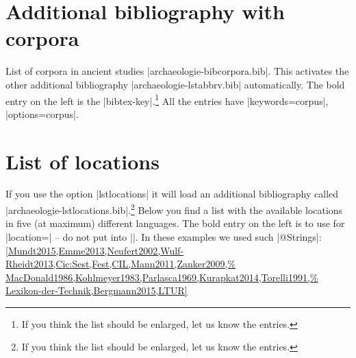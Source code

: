 \documentclass[a4paper,
10pt,
greek,
french,
spanish,
italian,
ngerman,
english
]{ltxdoc}
\begin{document}
\begin{multicols}{3}
  
\end{multicols}


\section{Additional bibliography with corpora}\label{list-bibcorpora}
List of corpora in ancient studies |archaeologie-bibcorpora.bib|.
This activates the other additional bibliography |archaeologie-lstabbrv.bib| automatically.
The bold entry on the left is the |bibtex-key|.\footnote{If you think the list should be enlarged, let us know the entries.}
All the entries have |keywords={corpus}|, |options={corpus}|.
\begin{multicols}{2}
  
\end{multicols}

\section{List of locations}\label{list-locations}
If you use the option |lstlocations| it will load an additional bibliography called |archaeologie-lstlocations.bib|.\footnote{If you think the list should be enlarged, let us know the entries.} 
Below you find a list with the available locations in five (at maximum) different languages.
The bold entry on the left is to use for |location=| -- do not put  into |{}|.
In these examples we used such |@Strings|:
\cref{Mundt2015,Emme2013,Neufert2002,Wulf-Rheidt2013,Cic:Sest,Fest,CIL,Mann2011,Zanker2009,%
MacDonald1986,Kohlmeyer1983,Parlasca1969,Kurapkat2014,Torelli1991,%
Lexikon-der-Technik,Bergmann2015,LTUR}
\end{document}
